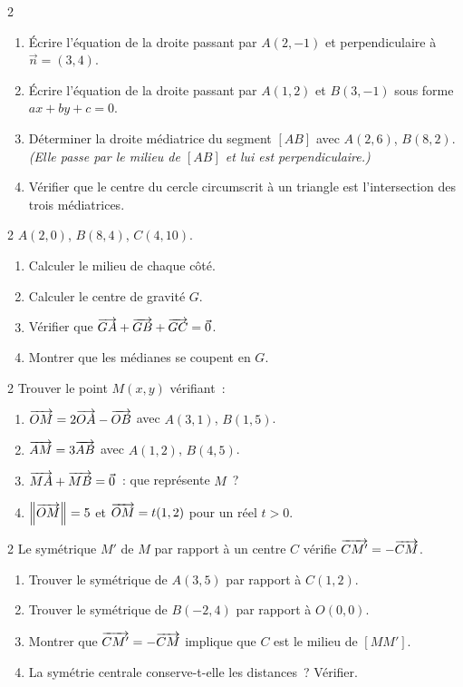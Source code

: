 \begin{exo}{2}
\begin{enumerate}
  \item \'Ecrire l'\'equation de la droite passant par $A(2,-1)$ et
        perpendiculaire \`a $\vec{n}=(3,4)$.
  \item \'Ecrire l'\'equation de la droite passant par $A(1,2)$ et
        $B(3,-1)$ sous forme $ax+by+c=0$.
  \item D\'eterminer la droite m\'ediatrice du segment $[AB]$
        avec $A(2,6)$, $B(8,2)$.
        \emph{(Elle passe par le milieu de $[AB]$ et lui est perpendiculaire.)}
  \item V\'erifier que le centre du cercle circumscrit \`a un triangle
        est l'intersection des trois m\'ediatrices.
\end{enumerate}
\end{exo}

\begin{exo}{2}
$A(2,0)$, $B(8,4)$, $C(4,10)$.
\begin{enumerate}
  \item Calculer le milieu de chaque c\^ot\'e.
  \item Calculer le centre de gravité $G$.
  \item V\'erifier que $\overrightarrow{GA}+\overrightarrow{GB}+\overrightarrow{GC}=\vec{0}$.
  \item Montrer que les m\'edianes se coupent en $G$.
\end{enumerate}
\end{exo}

\begin{exo}{2}
Trouver le point $M(x,y)$ v\'erifiant~:
\begin{enumerate}
  \item $\overrightarrow{OM} = 2\overrightarrow{OA} - \overrightarrow{OB}$ avec $A(3,1)$, $B(1,5)$.
  \item $\overrightarrow{AM} = 3\overrightarrow{AB}$ avec $A(1,2)$, $B(4,5)$.
  \item $\overrightarrow{MA} + \overrightarrow{MB} = \vec{0}$~: que repr\'esente $M$~?
  \item $\left\|\overrightarrow{OM}\right\| = 5$ et $\overrightarrow{OM} = t(1,2)$ pour un r\'eel $t>0$.
\end{enumerate}
\end{exo}

\begin{exo}{2}
Le sym\'etrique $M'$ de $M$ par rapport \`a un centre $C$ v\'erifie
$\overrightarrow{CM'} = -\overrightarrow{CM}$.
\begin{enumerate}
  \item Trouver le sym\'etrique de $A(3,5)$ par rapport \`a $C(1,2)$.
  \item Trouver le sym\'etrique de $B(-2,4)$ par rapport \`a $O(0,0)$.
  \item Montrer que $\overrightarrow{CM'}=-\overrightarrow{CM}$ implique que $C$ est le milieu de $[MM']$.
  \item La sym\'etrie centrale conserve-t-elle les distances~? V\'erifier.
\end{enumerate}
\end{exo}

